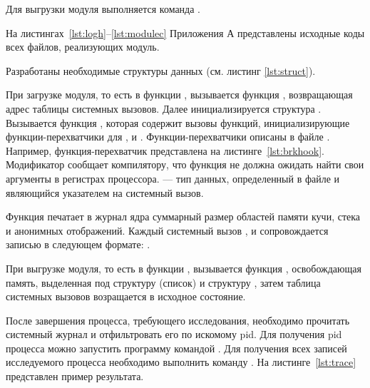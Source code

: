 Для выгрузки модуля выполняется команда .

На листингах~\ref{lst:logh}--\ref{lst:modulec} Приложения А представлены исходные коды всех файлов, реализующих модуль.

Разработаны необходимые структуры данных (см. листинг \ref{lst:struct}).



При загрузке модуля, то есть в функции , вызывается функция , возвращающая адрес таблицы системных вызовов. Далее инициализируется структура . Вызывается функция , которая содержит вызовы функций, инициализирующие функции-перехватчики для ,  и . Функции-перехватчики описаны в файле . Например, функция-перехватчик  представлена на листинге~\ref{lst:brkhook}. Модификатор  сообщает компилятору, что функция не должна ожидать найти свои аргументы в регистрах процессора.  --- тип данных, определенный в файле  и являющийся указателем на системный вызов.



Функция  печатает в журнал ядра суммарный размер областей памяти кучи, стека и анонимных отображений. Каждый системный вызов ,  и  сопровождается записью в следующем формате: .

При выгрузке модуля, то есть в функции , вызывается функция , освобождающая память, выделенная под структуру (список)  и структуру , затем таблица системных вызовов возращается в исходное состояние.

После завершения процесса, требующего исследования, необходимо прочитать системный журнал и отфильтровать его по искомому pid. Для получения pid процесса можно запустить программу командой . Для получения всех записей  исследуемого процесса необходимо выполнить команду . На листинге~\ref{lst:trace} представлен пример результата.

